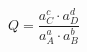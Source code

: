 \documentclass[preview]{standalone}
\begin{document}
\[Q = \frac{a_C^c \cdot a_D^d}{a_A^a \cdot a_B^b} \tag{1.2}\]
\end{document}
